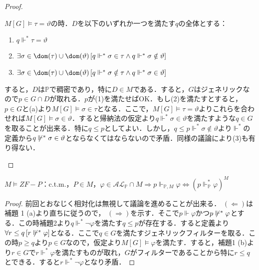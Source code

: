 \documentclass[a4j]{ltjsarticle}
\theoremstyle{definition}
\begin{document}
\begin{proof}
\begin{enumerate}[label=(\alph*)]
	$M[G] \models \tau = \vartheta$の時．$D$を以下のいずれか一つを満たす$q$の全体とする：
	\begin{enumerate}[label=(\arabic*)]
	 \item $q \mathrel{\Vdash^*} \tau = \vartheta$
	       \label{D:forces-equal}
	 \item $\exists \sigma \in \dom(\tau) \cup \dom(\vartheta)\,[q \mathrel{\Vdash^*} \sigma \in \tau \wedge q \mathrel{\Vdash^*} \sigma \notin \vartheta]$
	       \label{D:forces-tau-larger}
	 \item $\exists \sigma \in \dom(\tau) \cup \dom(\vartheta)\,[q \mathrel{\Vdash^*} \sigma \notin \tau \wedge q \mathrel{\Vdash^*} \sigma \in \vartheta]$
	       \label{D:forces-theta-larger}
	\end{enumerate}
	すると，$D$は$\mathbb{P}$で稠密であり，特に$D \in M$である．すると，$G$はジェネリックなので$p \in G \cap D$が取れる．$p$が(1)を満たせばOK．もし(2)を満たすとすると，$p \in G$と(a)より$M[G] \models \sigma \in \tau$となる．ここで，$M[G] \models \tau = \vartheta$よりこれらを合わせれば$M[G] \models \sigma \in \vartheta$．すると帰納法の仮定より$q \mathrel{\Vdash^*} \sigma \in \vartheta$を満たすような$q \in G$を取ることが出来る．特に$q \leq p$としてよい．しかし，$q \leq p \mathrel{\Vdash^*} \sigma \notin \vartheta$より$\mathrel{\Vdash^*}$の定義から$q \not\mathrel{\Vdash^*} \sigma \in \vartheta$とならなくてはならないので矛盾．同様の議論により(3)も有り得ない．\mbox{}
 \end{enumerate}
\end{proof}

\begin{lemma}
 $M \models ZF-P$：c.t.m.，$P \in M$，$\varphi \in \mathcal{AL}_\mathbb{P} \cap M \Longrightarrow p \Vdash_{\mathbb{P}, M} \varphi \Leftrightarrow (p \mathrel{\Vdash_\mathbb{P}^*} \varphi)^M$
\end{lemma}
\begin{proof}
 前回とおなじく相対化は無視して議論を進めることが出来る．
 $(\Leftarrow)$は補題 1 (a)より直ちに従うので，
 $(\Rightarrow)$を示す．そこで$p \Vdash \varphi$かつ$p \not\mathrel{\Vdash^*} \varphi$とする．この時補題2より$q \mathrel{\Vdash^*} \neg \varphi$を満たす$q \leq p$が存在する．すると定義より$\forall r \leq q \, [r \not\mathrel{\Vdash^*} \varphi]$となる．ここで$q \in G$を満たすジェネリックフィルターを取る．この時$p \geq q$より$p \in G$なので，仮定より$M[G] \models \varphi$を満たす．すると，補題1 (b)より$r \in G$で$r \mathrel{\Vdash^*} \varphi$を満たすものが取れ，$G$がフィルターであることから特に$r \leq q$とできる．すると$r \mathrel{\Vdash^*} \neg \varphi$となり矛盾．\mbox{}
\end{proof}
\end{document}
